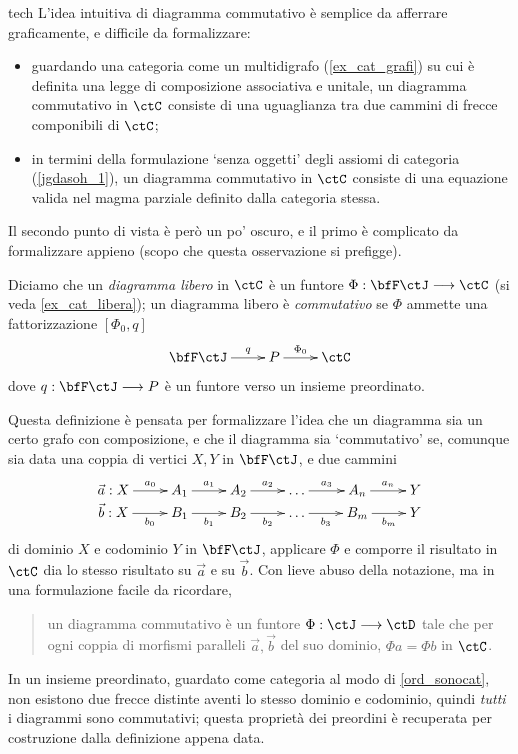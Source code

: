 \begin{hRemark}{tech}\label{cos_diag_comm}
	L'idea intuitiva di diagramma commutativo è semplice da afferrare graficamente, e difficile da formalizzare:
	\begin{itemize}
		\item guardando una categoria come un multidigrafo (\ref{ex_cat_grafi}) su cui è definita una legge di composizione associativa e unitale, un diagramma commutativo in \(\ctC\) consiste di una uguaglianza tra due cammini di frecce componibili di \(\ctC\);
		\item in termini della formulazione `senza oggetti' degli assiomi di categoria (\ref{jgdasoh_1}), un diagramma commutativo in \(\ctC\) consiste di una equazione valida nel magma parziale definito dalla categoria stessa.
	\end{itemize}
	Il secondo punto di vista è però un po' oscuro, e il primo è complicato da formalizzare appieno (scopo che questa osservazione si prefigge).

	Diciamo che un \emph{diagramma libero} in \(\ctC\) è un funtore \(\Phi : \bfF\ctJ \fun\ctC\) (si veda \ref{ex_cat_libera}); un diagramma libero è \emph{commutativo} se \(\Phi\) ammette una fattorizzazione \([\Phi_0,q]\)
	\[\xymatrix{
		\bfF\ctJ \ar[r]^-q & P \ar[r]^-{\Phi_0} & \ctC
		}\]
	dove \(q : \bfF\ctJ \fun P\) è un funtore verso un insieme preordinato.

	Questa definizione è pensata per formalizzare l'idea che un diagramma sia un certo grafo con composizione, e che il diagramma sia `commutativo' se, comunque sia data una coppia di vertici \(X,Y\) in \(\bfF\ctJ\), e due cammini
	\[\xymatrix@R=0cm{
		\vec a : X \ar[r]^-{a_0} & A_1 \ar[r]^-{a_1} & A_2 \ar[r]^-{a_2}  & \dots \ar[r]^-{a_3} & A_n \ar[r]^-{a_n} & Y\\
		\vec b : X \ar[r]_-{b_0} & B_1 \ar[r]_-{b_1} & B_2 \ar[r]_-{b_2} & \dots \ar[r]_-{b_3} & B_m \ar[r]_-{b_m} & Y
		}\]
	di dominio \(X\) e codominio \(Y\) in \(\bfF\ctJ\), applicare \(\Phi\) e comporre il risultato in \(\ctC\) dia lo stesso risultato su \(\vec a\) e su \(\vec b\). Con lieve abuso della notazione, ma in una formulazione facile da ricordare,
	\begin{quote}
		un diagramma commutativo è un funtore \(\Phi : \ctJ \fun\ctD\) tale che per ogni coppia di morfismi paralleli \(\vec a,\vec b\) del suo dominio, \(\Phi a = \Phi b\) in \(\ctC\).
	\end{quote}

	In un insieme preordinato, guardato come categoria al modo di \ref{ord_sonocat}, non esistono due frecce distinte aventi lo stesso dominio e codominio, quindi \emph{tutti} i diagrammi sono commutativi; questa proprietà dei preordini è recuperata per costruzione dalla definizione appena data.
\end{hRemark}
